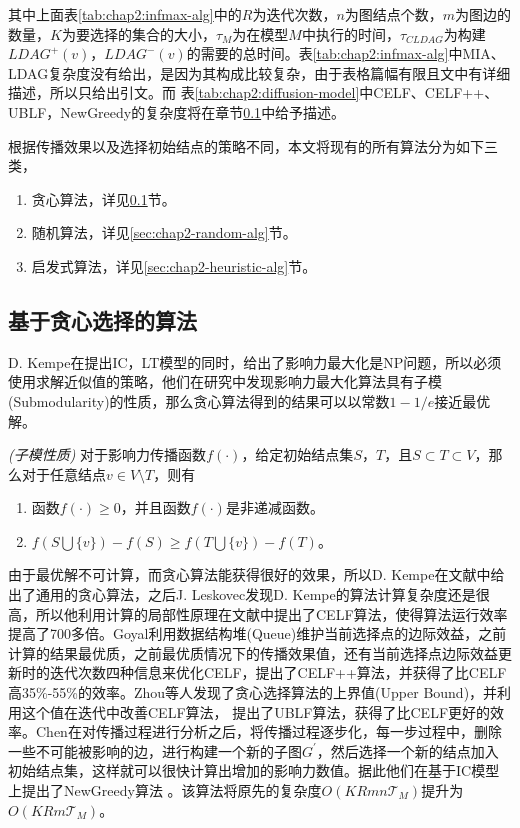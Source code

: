其中上面表\ref{tab:chap2:infmax-alg}中的$R$为迭代次数，$n$为图结点个数，$m$为图边的数量，$K$为要选择的集合的大小，$\tau_{M}$为在模型$M$中执行的时间，$\tau_{CLDAG}$为构建$LDAG^{+}(v)$，$LDAG^{-}(v)$的需要的总时间。表\ref{tab:chap2:infmax-alg}中MIA、LDAG复杂度没有给出，是因为其构成比较复杂，由于表格篇幅有限且文中有详细描述，所以只给出引文。而
表\ref{tab:chap2:diffusion-model}中CELF、CELF++、UBLF，NewGreedy的复杂度将在章节\ref{sec:chap2-greedy-alg}中给予描述。


根据传播效果以及选择初始结点的策略不同，本文将现有的所有算法分为如下三类，
\begin{enumerate}
\item 贪心算法，详见\ref{sec:chap2-greedy-alg}节。
\item 随机算法，详见\ref{sec:chap2-random-alg}节。
\item 启发式算法，详见\ref{sec:chap2-heuristic-alg}节。
\end{enumerate}



\subsection{基于贪心选择的算法}
\label{sec:chap2-greedy-alg}
D. Kempe\cite{kempe2003maximizing}在提出IC，LT模型的同时，给出了影响力最大化是NP问题，所以必须使用求解近似值的策略，他们在研究中发现影响力最大化算法具有子模(Submodularity)的性质，那么贪心算法得到的结果可以以常数$1-1/e$接近最优解。
\begin{definition}
\emph{(子模性质)}
对于影响力传播函数$f(\cdot)$，给定初始结点集$S$，$T$，且$S \subset T \subset V$，那么对于任意结点$v \in V\setminus T$，则有
\begin{enumerate}
\item 函数$f(\cdot) \geq 0$，并且函数$f(\cdot)$是非递减函数。
\item $f(S \bigcup \{v\}) -  f(S) \geq f(T \bigcup \{v\}) -  f(T)$。
\end{enumerate}
\end{definition}


由于最优解不可计算，而贪心算法能获得很好的效果，所以D. Kempe在文献\cite{kempe2003maximizing}中给出了通用的贪心算法，之后J. Leskovec发现D. Kempe的算法计算复杂度还是很高，所以他利用计算的局部性原理在文献\cite{leskovec2007cost}中提出了CELF算法，使得算法运行效率提高了700多倍。Goyal\cite{goyal2011celf++}利用数据结构堆(Queue)维护当前选择点的边际效益，之前计算的结果最优质，之前最优质情况下的传播效果值，还有当前选择点边际效益更新时的迭代次数四种信息来优化CELF，提出了CELF++算法，并获得了比CELF高35\%-55\%的效率。Zhou\cite{zhou2013ublf}等人发现了贪心选择算法的上界值(Upper Bound)，并利用这个值在迭代中改善CELF算法， 提出了UBLF算法，获得了比CELF更好的效率。Chen\cite{chen2009efficient}在对传播过程进行分析之后，将传播过程逐步化，每一步过程中，删除一些不可能被影响的边，进行构建一个新的子图$G^{'}$，然后选择一个新的结点加入初始结点集，这样就可以很快计算出增加的影响力数值。据此他们在基于IC模型上提出了NewGreedy算法
。该算法将原先的复杂度$O(KRmn\mathcal{T}_{M})$提升为$O(KRm\mathcal{T}_{M})$。


